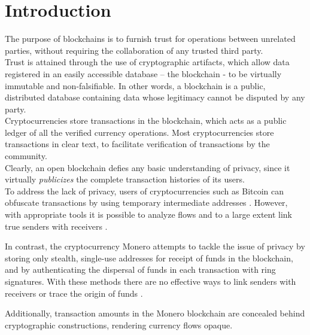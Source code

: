 

\chapter{Introduction}
\label{chap:introduction}

The purpose of blockchains is to furnish trust for operations between unrelated parties, without requiring the collaboration of any trusted third party.
\\ \newline
Trust is attained through the use of cryptographic artifacts, which allow data registered in an easily accessible database – the blockchain - to be virtually immutable and non-falsifiable. In other words, a blockchain is a public, distributed database containing data whose legitimacy cannot be disputed by any party.
\\ \newline
Cryptocurrencies store transactions in the blockchain, which acts as a public ledger of all the verified currency operations. Most cryptocurrencies store transactions in clear text, to facilitate verification of transactions by the community.
\\ \newline
Clearly, an open blockchain defies any basic understanding of privacy, since it virtually {\em publicizes} the complete transaction histories of its users.
\\ \newline
To address the lack of privacy, users of cryptocurrencies such as Bitcoin can obfuscate transactions by using temporary intermediate addresses \cite{DBLP:journals/corr/NarayananM17}. However, with appropriate tools it is possible to analyze flows and to a large extent link true senders with receivers \cite{DBLP:journals/corr/ShenTuY15b, DK-police-tracing-btc, Andrew-Cox-Sandia}.

In contrast, the cryptocurrency Monero attempts to tackle the issue of privacy by storing only stealth, single-use addresses for receipt of funds in the blockchain, and by authenticating the dispersal of funds in each transaction with ring signatures. With these methods there are no effective ways to link senders with receivers or trace the origin of funds \cite{Monero-intro}.

Additionally, transaction amounts in the Monero blockchain are concealed behind cryptographic constructions, rendering currency flows opaque.

